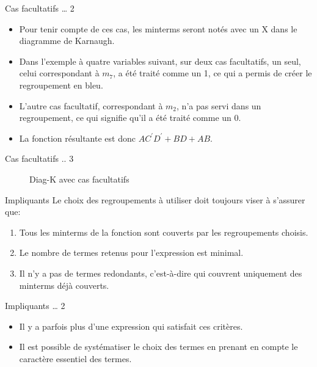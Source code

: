 \documentclass[presentation]{beamer}
\begin{document}
\begin{frame}[label={sec:org4e1601f}]{Cas facultatifs \ldots{} 2}
\begin{itemize}
\item Pour tenir compte de ces cas, les minterms seront notés avec un X dans le diagramme de Karnaugh.

\item Dans l'exemple à quatre variables suivant, sur deux cas facultatifs, un seul, celui correspondant à \(m_{7}\), a été traité comme un 1, ce qui a permis de créer le regroupement en bleu.

\item L'autre cas facultatif, correspondant à \(m_{2}\), n'a pas servi dans un regroupement, ce qui signifie qu'il a été traité comme un 0.

\item La fonction résultante est donc \(A C^\prime D^\prime + BD + AB\).
\end{itemize}
\end{frame}

\begin{frame}[label={sec:org956feae}]{Cas facultatifs .. 3}
\begin{figure}[htbp]
\centering

\caption{\label{fig:org35640e9}Diag-K avec cas facultatifs}
\end{figure}
\end{frame}


\begin{frame}[label={sec:org01c09b0}]{Impliquants}
Le choix des regroupements à utiliser doit toujours viser à s'assurer que:
\begin{enumerate}
\item Tous les minterms de la fonction sont couverts par les regroupements choisis.
\item Le nombre de termes retenus pour l'expression est minimal.
\item Il n'y a pas de termes redondants, c'est-à-dire qui couvrent
uniquement des minterms déjà couverts.
\end{enumerate}
\end{frame}

\begin{frame}[label={sec:org363346b}]{Impliquants \ldots{} 2}
\begin{itemize}
\item Il y a parfois plus d'une expression qui satisfait ces critères.

\item Il est possible de systématiser le choix des termes en prenant en compte le caractère essentiel des termes.
\end{itemize}
\end{frame}
\end{document}
